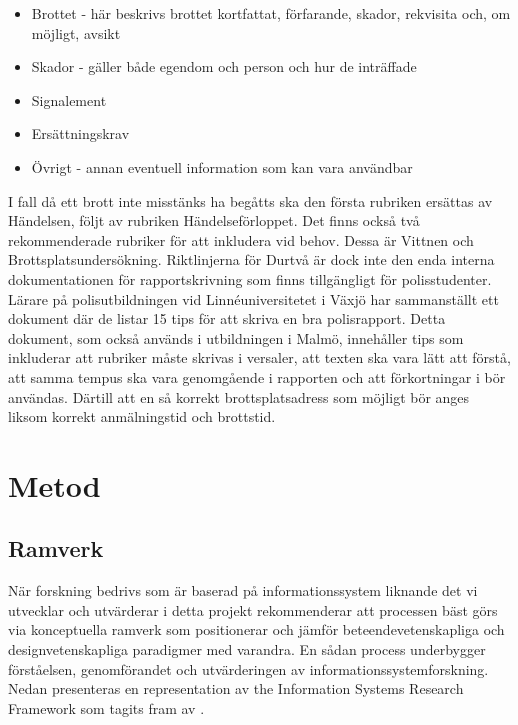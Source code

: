 \documentclass[swedish]{maucsthesis}
\begin{document}
\begin{itemize}
\item Brottet - här beskrivs brottet kortfattat, förfarande, skador, rekvisita
  och, om möjligt, avsikt
\item Skador - gäller både egendom och person och hur de inträffade
\item Signalement
\item Ersättningskrav
\item Övrigt - annan eventuell information som kan vara användbar
\end{itemize}

I fall då ett brott inte misstänks ha begåtts ska den första rubriken ersättas
av Händelsen, följt av rubriken Händelseförloppet. Det finns också två
rekommenderade rubriker för att inkludera vid behov. Dessa är Vittnen och
Brottsplatsundersökning. Riktlinjerna för Durtvå är dock inte den enda interna
dokumentationen för rapportskrivning som finns tillgängligt för polisstudenter.
Lärare på polisutbildningen vid Linnéuniversitetet i Växjö har sammanställt ett
dokument där de listar 15 tips för att skriva en bra polisrapport. Detta
dokument, som också används i utbildningen i Malmö, innehåller tips som
inkluderar att rubriker måste skrivas i versaler, att texten ska vara lätt att
förstå, att samma tempus ska vara genomgående i rapporten och att förkortningar
i bör användas. Därtill att en så korrekt brottsplatsadress som möjligt bör
anges liksom korrekt anmälningstid och brottstid.

\section{Metod}

\subsection{Ramverk}

När forskning bedrivs som är baserad på informationssystem liknande det vi
utvecklar och utvärderar i detta projekt rekommenderar \cite{hevner:2004} att
processen bäst görs via konceptuella ramverk som positionerar och jämför
beteendevetenskapliga och designvetenskapliga paradigmer med varandra. En sådan
process underbygger förståelsen, genomförandet och utvärderingen av
informationssystemforskning. Nedan presenteras en representation av the
Information Systems Research Framework som tagits fram av
\citeauthor{hevner:2004}.
\end{document}
